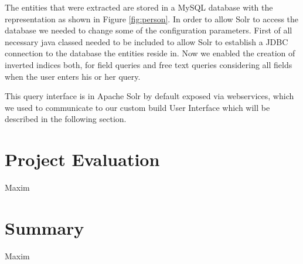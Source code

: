\documentclass[11pt,titlepage,oneside,openany]{article}
\begin{document}
The entities that were extracted are stored in a MySQL database with the representation as shown in Figure \ref{fig:person}.  In order to allow Solr to access the database we needed to change some of the configuration parameters. First of all necessary java classed needed to be included to allow Solr to establish a JDBC connection to the database the entities reside in. Now we enabled the creation of inverted indices both, for field queries and free text queries considering all fields when the user enters his or her query. 

This query interface is in Apache Solr by default exposed via webservices, which  we used to communicate to our custom build User Interface which will be described in the following section.
\section{Project Evaluation}
Maxim
\section{Summary}
Maxim
%
%





\newpage





\end{document}
